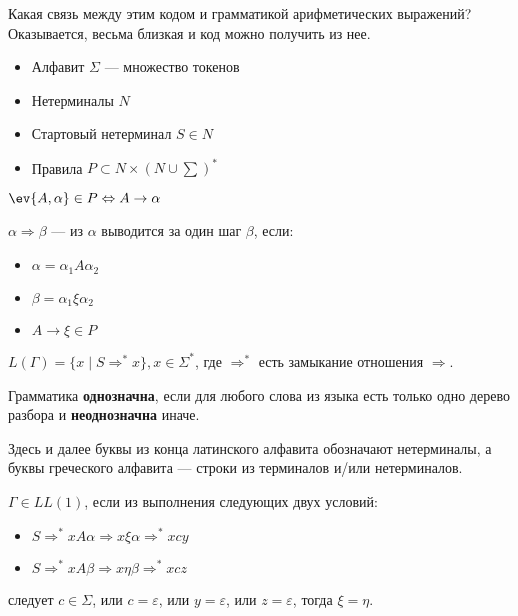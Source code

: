 Какая связь между этим кодом и грамматикой арифметических выражений? Оказывается, весьма близкая и код можно получить из нее.


\begin{definition}\itemfix
    \begin{itemize}
        \item Алфавит \(\Sigma\) --- множество токенов
        \item Нетерминалы \(N\)
        \item Стартовый нетерминал \(S \in N\)
        \item Правила \(P \subset N \times (N \cup \sum)^*\)
    \end{itemize}
\end{definition}
\begin{definition}
    \(\ev{A, \alpha} \in P \Leftrightarrow A \to \alpha\)
\end{definition}
\begin{definition}
    \(\alpha \Rightarrow \beta\) --- из \(\alpha\) выводится за один шаг \(\beta\), если:
    \begin{itemize}
        \item \(\alpha = \alpha_1 A \alpha_2\)
        \item \(\beta = \alpha_1 \xi \alpha_2\)
        \item \(A \to \xi \in P\)
    \end{itemize}
\end{definition}
\begin{definition}\itemfix
    \(L(\Gamma) = \{x \mid S \Rightarrow^* x\}, x \in \Sigma^*\), где \( \Rightarrow^*\) есть замыкание отношения \( \Rightarrow \).
\end{definition}

\begin{definition}
    Грамматика \textbf{однозначна}, если для любого слова из языка есть только одно дерево разбора и \textbf{неоднозначна} иначе.
\end{definition}

\begin{remark}
    Здесь и далее буквы из конца латинского алфавита обозначают нетерминалы, а буквы греческого алфавита --- строки из терминалов и/или нетерминалов.
\end{remark}
\begin{definition}
    \(\Gamma \in LL(1)\), если из выполнения следующих двух условий:
    \begin{itemize}
        \item \(S \Rightarrow^* xA\alpha \Rightarrow x\xi\alpha \Rightarrow^* xcy\)
        \item \(S \Rightarrow^* xA\beta \Rightarrow x\eta\beta \Rightarrow^* xcz\)
    \end{itemize}
    следует \(c \in \Sigma\), или \(c = \varepsilon\), или \(y = \varepsilon\), или \(z = \varepsilon\), тогда \(\xi = \eta\).
\end{definition}

